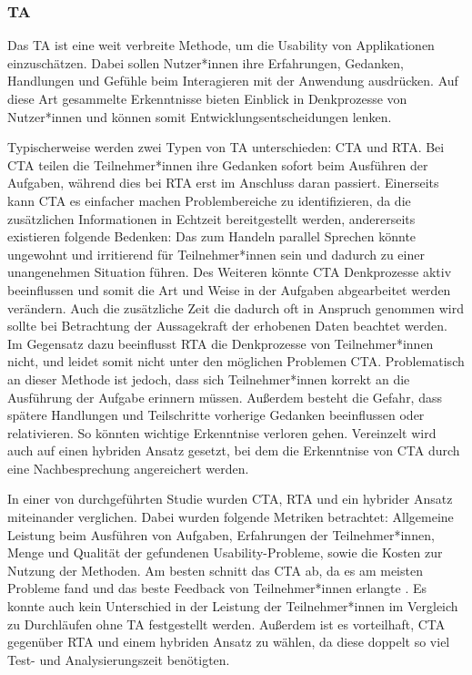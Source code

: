 \cite{barnumUsabilityTesting2021}

\subsubsection{\acl{TA}}
Das \ac{TA} ist eine weit verbreite Methode, um die Usability von Applikationen einzuschätzen. Dabei sollen Nutzer*innen ihre Erfahrungen, Gedanken, Handlungen und Gefühle beim Interagieren mit der Anwendung ausdrücken. Auf diese Art gesammelte Erkenntnisse  bieten Einblick in Denkprozesse von Nutzer*innen und können somit Entwicklungsentscheidungen lenken. \cite{alhadretiRethinkingThinking2018}

Typischerweise werden zwei Typen von \ac{TA} unterschieden: \ac{CTA} und \ac{RTA}. Bei \ac{CTA} teilen die Teilnehmer*innen ihre Gedanken sofort beim Ausführen der Aufgaben, während dies bei \ac{RTA} erst im Anschluss daran passiert. Einerseits kann \ac{CTA} es einfacher machen Problembereiche zu identifizieren, da die zusätzlichen Informationen in Echtzeit bereitgestellt werden, andererseits existieren folgende Bedenken: Das zum Handeln parallel Sprechen könnte ungewohnt und irritierend für Teilnehmer*innen sein und dadurch zu einer unangenehmen Situation führen. Des Weiteren könnte \ac{CTA} Denkprozesse aktiv beeinflussen und somit die Art und Weise in der Aufgaben abgearbeitet werden verändern. Auch die zusätzliche Zeit die dadurch oft in Anspruch genommen wird sollte bei Betrachtung der Aussagekraft der erhobenen Daten beachtet werden.  Im Gegensatz dazu beeinflusst \ac{RTA} die Denkprozesse von Teilnehmer*innen nicht, und leidet somit nicht unter den möglichen Problemen \ac{CTA}. Problematisch an dieser Methode ist jedoch, dass sich Teilnehmer*innen korrekt an die Ausführung der Aufgabe erinnern müssen. Außerdem besteht die Gefahr, dass spätere Handlungen und Teilschritte vorherige Gedanken beeinflussen oder relativieren. So könnten wichtige Erkenntnise verloren gehen. Vereinzelt wird auch auf einen hybriden Ansatz gesetzt, bei dem die Erkenntnise von \ac{CTA} durch eine Nachbesprechung angereichert werden. \cite{alhadretiRethinkingThinking2018}

In einer \citeyear{alhadretiRethinkingThinking2018} von \citeauthor{alhadretiRethinkingThinking2018} \cite{alhadretiRethinkingThinking2018} durchgeführten Studie wurden \ac{CTA}, \ac{RTA} und ein hybrider Ansatz miteinander verglichen. Dabei wurden folgende Metriken betrachtet: Allgemeine Leistung beim Ausführen von Aufgaben, Erfahrungen der Teilnehmer*innen, Menge und Qualität der gefundenen Usability-Probleme, sowie die Kosten zur Nutzung der Methoden. Am besten schnitt das \acl{CTA} ab, da es am meisten Probleme fand und das beste Feedback von Teilnehmer*innen erlangte . Es konnte auch kein Unterschied in der Leistung der Teilnehmer*innen im Vergleich zu Durchläufen ohne \ac{TA} festgestellt werden. Außerdem ist es vorteilhaft, \ac{CTA} gegenüber \ac{RTA} und einem hybriden Ansatz zu wählen, da diese doppelt so viel Test- und Analysierungszeit benötigten. \cite{alhadretiRethinkingThinking2018} 

